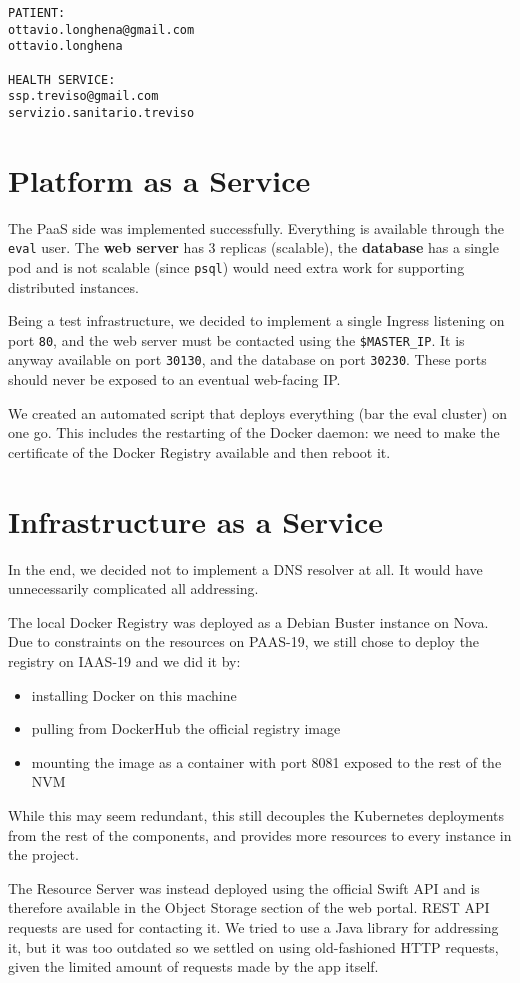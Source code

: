 \documentclass[a4paper,11pt,hidelinks,twocolumn]{article}
\begin{document}
\begin{verbatim}
PATIENT:
ottavio.longhena@gmail.com
ottavio.longhena

HEALTH SERVICE:
ssp.treviso@gmail.com
servizio.sanitario.treviso
\end{verbatim}

\section{Platform as a Service}

The PaaS side was implemented successfully. Everything is available through the \texttt{eval} user. The \textbf{web server} has 3 replicas (scalable), the \textbf{database} has a single pod and is not scalable (since \texttt{psql}) would need extra work for supporting distributed instances.

Being a test infrastructure, we decided to implement a single Ingress listening on port \verb=80=, and the web server must be contacted using the \verb=$MASTER_IP=. It is anyway available on port \verb=30130=, and the database on port \verb=30230=. These ports should never be exposed to an eventual web-facing IP.

We created an automated script that deploys everything (bar the eval cluster) on one go. This includes the restarting of the Docker daemon: we need to make the certificate of the Docker Registry available and then reboot it.

\section{Infrastructure as a Service}

In the end, we decided not to implement a DNS resolver at all. It would have unnecessarily complicated all addressing.

The local Docker Registry was deployed as a Debian Buster instance on Nova. Due to constraints on the resources on PAAS-19, we still chose to deploy the registry on IAAS-19 and we did it by:

\begin{itemize}
  \item installing Docker on this machine
  \item pulling from DockerHub the official registry image
  \item mounting the image as a container with port 8081 exposed to the rest of the NVM
\end{itemize}

While this may seem redundant, this still decouples the Kubernetes deployments from the rest of the components, and provides more resources to every instance in the project.

The Resource Server was instead deployed using the official Swift API and is therefore available in the Object Storage section of the web portal. REST API requests are used for contacting it. We tried to use a Java library for addressing it, but it was too outdated so we settled on using old-fashioned HTTP requests, given the limited amount of requests made by the app itself.

\endgroup
\end{document}
